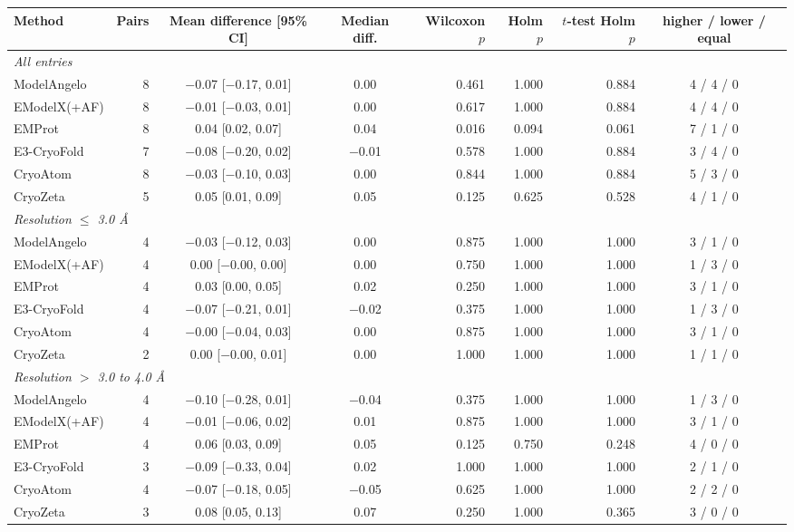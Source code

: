 \begin{tabular}{lrccrrrc}
\toprule
Method & Pairs & Mean difference [95\% CI] & Median diff. & Wilcoxon $p$ & Holm $p$ & $t$-test Holm $p$ & higher / lower / equal \\
\midrule
\multicolumn{8}{l}{\emph{All entries}} \\
ModelAngelo & 8 & $-$0.07 [$-$0.17, 0.01] & 0.00 & 0.461 & 1.000 & 0.884 & 4 / 4 / 0 \\
EModelX(+AF) & 8 & $-$0.01 [$-$0.03, 0.01] & 0.00 & 0.617 & 1.000 & 0.884 & 4 / 4 / 0 \\
EMProt & 8 & 0.04 [0.02, 0.07] & 0.04 & 0.016 & 0.094 & 0.061 & 7 / 1 / 0 \\
E3-CryoFold & 7 & $-$0.08 [$-$0.20, 0.02] & $-$0.01 & 0.578 & 1.000 & 0.884 & 3 / 4 / 0 \\
CryoAtom & 8 & $-$0.03 [$-$0.10, 0.03] & 0.00 & 0.844 & 1.000 & 0.884 & 5 / 3 / 0 \\
CryoZeta & 5 & 0.05 [0.01, 0.09] & 0.05 & 0.125 & 0.625 & 0.528 & 4 / 1 / 0 \\
\midrule
\multicolumn{8}{l}{\emph{Resolution $\leq$ 3.0 \AA}} \\
ModelAngelo & 4 & $-$0.03 [$-$0.12, 0.03] & 0.00 & 0.875 & 1.000 & 1.000 & 3 / 1 / 0 \\
EModelX(+AF) & 4 & 0.00 [$-$0.00, 0.00] & 0.00 & 0.750 & 1.000 & 1.000 & 1 / 3 / 0 \\
EMProt & 4 & 0.03 [0.00, 0.05] & 0.02 & 0.250 & 1.000 & 1.000 & 3 / 1 / 0 \\
E3-CryoFold & 4 & $-$0.07 [$-$0.21, 0.01] & $-$0.02 & 0.375 & 1.000 & 1.000 & 1 / 3 / 0 \\
CryoAtom & 4 & $-$0.00 [$-$0.04, 0.03] & 0.00 & 0.875 & 1.000 & 1.000 & 3 / 1 / 0 \\
CryoZeta & 2 & 0.00 [$-$0.00, 0.01] & 0.00 & 1.000 & 1.000 & 1.000 & 1 / 1 / 0 \\
\midrule
\multicolumn{8}{l}{\emph{Resolution $>$ 3.0 to 4.0 \AA}} \\
ModelAngelo & 4 & $-$0.10 [$-$0.28, 0.01] & $-$0.04 & 0.375 & 1.000 & 1.000 & 1 / 3 / 0 \\
EModelX(+AF) & 4 & $-$0.01 [$-$0.06, 0.02] & 0.01 & 0.875 & 1.000 & 1.000 & 3 / 1 / 0 \\
EMProt & 4 & 0.06 [0.03, 0.09] & 0.05 & 0.125 & 0.750 & 0.248 & 4 / 0 / 0 \\
E3-CryoFold & 3 & $-$0.09 [$-$0.33, 0.04] & 0.02 & 1.000 & 1.000 & 1.000 & 2 / 1 / 0 \\
CryoAtom & 4 & $-$0.07 [$-$0.18, 0.05] & $-$0.05 & 0.625 & 1.000 & 1.000 & 2 / 2 / 0 \\
CryoZeta & 3 & 0.08 [0.05, 0.13] & 0.07 & 0.250 & 1.000 & 0.365 & 3 / 0 / 0 \\
\bottomrule
\end{tabular}
